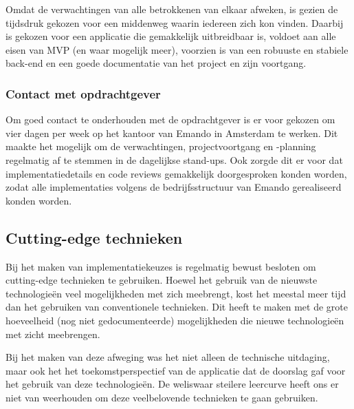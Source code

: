Omdat de verwachtingen van alle betrokkenen van elkaar afweken, is gezien de tijdsdruk gekozen voor een middenweg waarin iedereen zich kon vinden. Daarbij is gekozen voor een applicatie die gemakkelijk uitbreidbaar is, voldoet aan alle eisen van MVP (en waar mogelijk meer), voorzien is van een robuuste en stabiele back-end en een goede documentatie van het project en zijn voortgang.  

\subsubsection{Contact met opdrachtgever}
Om goed contact te onderhouden met de opdrachtgever is er voor gekozen om vier dagen per week op het kantoor van Emando in Amsterdam te werken. Dit maakte het mogelijk om de verwachtingen, projectvoortgang en -planning regelmatig af te stemmen in de dagelijkse stand-ups. Ook zorgde dit er voor dat implementatiedetails en code reviews gemakkelijk doorgesproken konden worden, zodat alle implementaties volgens de bedrijfsstructuur van Emando gerealiseerd konden worden.

\subsection{Cutting-edge technieken}
Bij het maken van implementatiekeuzes is regelmatig bewust besloten om cutting-edge technieken te gebruiken. Hoewel het gebruik van de nieuwste technologieën veel mogelijkheden met zich meebrengt, kost het meestal meer tijd dan het gebruiken van conventionele technieken. Dit heeft te maken met de grote hoeveelheid (nog niet gedocumenteerde) mogelijkheden die nieuwe technologieën met zicht meebrengen.

Bij het maken van deze afweging was het niet alleen de technische uitdaging, maar ook het het toekomstperspectief van de applicatie dat de doorslag gaf voor het gebruik van deze technologieën. De weliswaar steilere leercurve heeft ons er niet van weerhouden om deze veelbelovende technieken te gaan gebruiken.